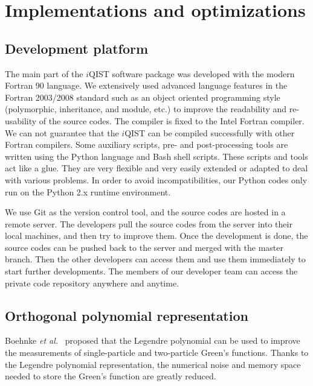 \section{Implementations and optimizations}
\subsection{Development platform}
The main part of the $i$QIST software package was developed with the modern Fortran 90 language. We extensively used advanced language features in the Fortran 2003/2008 standard such as an object oriented programming style (polymorphic, inheritance, and module, etc.) to improve the readability and re-usability of the source codes. The compiler is fixed to the Intel Fortran compiler. We can not guarantee that the $i$QIST can be compiled successfully with other Fortran compilers. Some auxiliary scripts, pre- and post-processing tools are written using the Python language and Bash shell scripts. These scripts and tools act like a glue. They are very flexible and very easily extended or adapted to deal with various problems. In order to avoid incompatibilities, our Python codes only run on the Python 2.x runtime environment.

We use Git as the version control tool, and the source codes are hosted in a remote server. The developers pull the source codes from the server into their local machines, and then try to improve them. Once the development is done, the source codes can be pushed back to the server and merged with the master branch. Then the other developers can access them and use them immediately to start further developments. The members of our developer team can access the private code repository anywhere and anytime.  

\subsection{Orthogonal polynomial representation}
Boehnke \emph{et al.}~\cite{PhysRevB.84.075145} proposed that the Legendre polynomial can be used to improve the measurements of single-particle and two-particle Green's functions. Thanks to the Legendre polynomial representation, the numerical noise and memory space needed to store the Green's function are greatly reduced.

